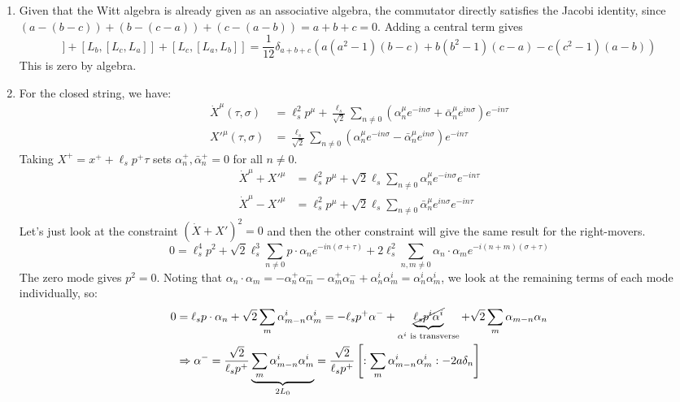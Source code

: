 \documentclass[11pt, class=article, crop=false]{standalone}
\begin{document}
\begin{enumerate}
%
%
%
% 
	 \item Given that the Witt algebra is already given as an associative algebra, the commutator directly satisfies the Jacobi identity, since $(a- (b-c)) + (b-(c-a)) + (c-(a-b)) = a+b+c = 0$. Adding a central term gives 
	 \begin{equation}
	 	[L_a, [L_b, L_c]] + [L_b, [L_c, L_a]] + [L_c, [L_a, L_b]] = \frac{1}{12} \delta_{a+b+c} (a(a^2-1) (b-c) + b(b^2-1) (c-a) - c(c^2-1) (a-b) )
	 \end{equation}
	 This is zero by algebra. 
	 
	 \item For the closed string, we have:
	 \[
	 \begin{aligned}
		\dot X^\mu(\tau, \sigma) &= \ell_s^2 p^\mu + \frac{\ell_s}{\sqrt 2} \sum_{n \neq 0} (\alpha_n^\mu e^{-in\sigma} + \bar \alpha_{n}^\mu e^{i n \sigma}) e^{- i n \tau}\\
		{X'}^\mu (\tau, \sigma) &= \frac{\ell_s}{\sqrt2} \sum_{n \neq 0} (\alpha_n^\mu e^{-in \sigma} - \bar \alpha_{n}^\mu e^{i n \sigma} ) e^{-in\tau}
	 \end{aligned}
	 \]
	 Taking $X^+ = x^+ + \ell_s p^+ \tau$ sets $\alpha_n^+, \bar \alpha_n^+ = 0$ for all $n \neq 0$.
	 \[
	 \begin{aligned}
	 	\dot X^\mu + {X'}^\mu &= \ell_s^2 p^\mu + \sqrt2 \ell_s \sum_{n \neq 0} \alpha_n^\mu e^{-in\sigma} e^{-in\tau}\\
		\dot X^\mu - {X'}^\mu &= \ell_s^2 p^\mu + \sqrt2 \ell_s \sum_{n \neq 0} \bar \alpha_n^\mu e^{in\sigma} e^{-in\tau}
	 \end{aligned}
	 \]
	 Let's just look at the constraint $(\dot X + X')^2 = 0$ and then the other constraint will give the same result for the right-movers. 
	 \[
	 	0 = \ell_s^4 p^2 + \sqrt2 \ell_s^3 \sum_{n \neq 0} p \cdot \alpha_n e^{-in (\sigma + \tau)} + 2 \ell_s^2 \sum_{n, m \neq 0} \alpha_n \cdot \alpha_m e^{-i(n+m) (\sigma+\tau)}
	 \]
	 The zero mode gives $p^2 = 0$. Noting that $\alpha_n \cdot \alpha_m = - \alpha^+_{n} \alpha^-_m - \alpha^+_{m} \alpha^-_n + \alpha^i_n \alpha^i_m = \alpha^i_n \alpha^i_m$, we look at the remaining terms of each mode individually, so:
	 \[
	 \begin{aligned}
	 	0 &=\ell_s p \cdot \alpha_{n} + \sqrt2 \sum_{m} \alpha_{m-n}^i \alpha_m^i = - \ell_s p^+ \alpha^- +  \underbrace{\cancel{\ell_s p^i \alpha^i}}_{\alpha^i\text{ is transverse}} + \sqrt2 \sum_{m} \alpha_{m-n} \alpha_n\\
		& \Rightarrow \alpha^- = \frac{\sqrt{2}}{\ell_s p^+} \underbrace{\sum_{m} \alpha_{m-n}^i \alpha_m^i}_{2 L_0} = \frac{\sqrt{2}}{\ell_s p^+} \left[: \sum_{m} \alpha_{m-n}^i \alpha_m^i : - 2 a \delta_{n}\right]
	 \end{aligned}
	 \]
	 

\end{enumerate}
\end{document}
